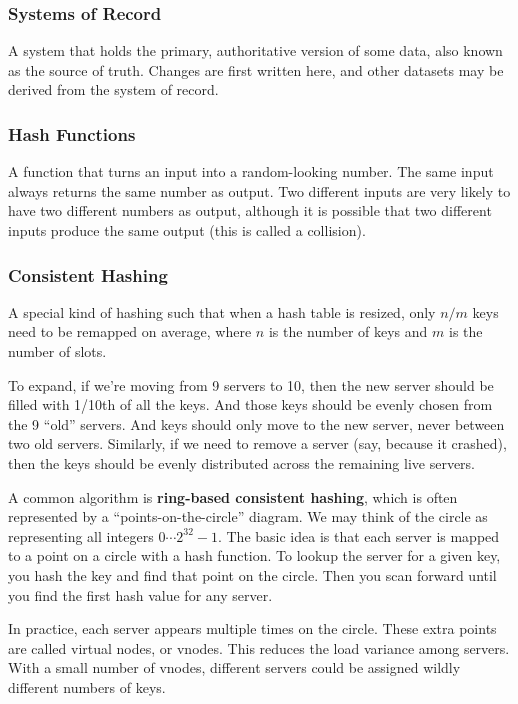 \documentclass{article}
\begin{document}
    \subsubsection{Systems of Record}
    A system that holds the primary, authoritative version of some data, also known as  the source of truth. Changes are first written here, and other datasets may be derived from the system of record.
    
    \subsubsection{Hash Functions}
    A function that turns an input into a random-looking number. The same input always returns the same number as output. Two different inputs are very likely to have two different numbers as output,  although it is possible that two different inputs produce the same output (this is called a collision).
    
    \subsubsection{Consistent Hashing}
    A special kind of hashing such that when a hash table is resized, only $n/m$ keys need to be remapped on average, where $n$ is the number of keys and $m$ is the number of slots.
    
    To expand, if we’re moving from 9 servers to 10, then the new server should be filled with 1/10th of all the keys. And those keys should be evenly chosen from the 9 ``old” servers. And keys should only move to the new server, never between two old servers. Similarly, if we need to remove a server (say, because it crashed), then the keys should be evenly distributed across the remaining live servers.
    
    A common algorithm is \textbf{ring-based consistent hashing}, which is often represented by a ``points-on-the-circle” diagram. We may think of the circle as representing all integers $0 \cdots2^{32}-1$. The basic idea is that each server is mapped to a point on a circle with a hash function. To lookup the server for a given key, you hash the key and find that point on the circle. Then you scan forward until you find the first hash value for any server.
    
    In practice, each server appears multiple times on the circle. These extra points are called virtual nodes, or vnodes. This reduces the load variance among servers. With a small number of vnodes, different servers could be assigned wildly different numbers of keys.
    
\end{document}
